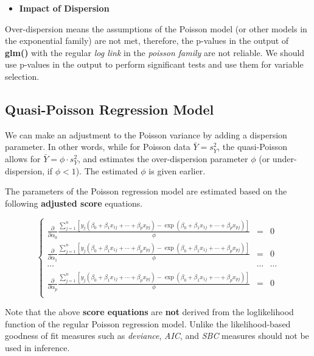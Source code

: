 \documentclass[
]{book}
\providecommand{\tightlist}{%
  \setlength{\itemsep}{0pt}\setlength{\parskip}{0pt}}
\begin{document}
\begin{itemize}
\tightlist
\item
  \textbf{Impact of Dispersion}
\end{itemize}

Over-dispersion means the assumptions of the Poisson model (or other models in the exponential family) are not met, therefore, the p-values in the output of \textbf{glm()} with the regular \emph{log link} in the \emph{poisson family} are not reliable. We should use p-values in the output to perform significant tests and use them for variable selection.

\hfill\break

\hypertarget{quasi-poisson-regression-model}{%
\subsection{Quasi-Poisson Regression Model}\label{quasi-poisson-regression-model}}

We can make an adjustment to the Poisson variance by adding a dispersion parameter. In other words, while for Poisson data \(\bar{Y} = s^2_Y\), the quasi-Poisson allows for \(\bar{Y} = \phi \cdot s^2_Y\), and estimates the over-dispersion parameter \(\phi\) (or under-dispersion, if \(\phi < 1\)). The estimated \(\phi\) is given earlier.

The parameters of the Poisson regression model are estimated based on the following \textbf{adjusted score} equations.

\[
\left\{
\begin{array}{ccccc}
 \frac{\partial}{\partial \alpha_0} \frac{\sum_{j=1}^n \left[y_j(\beta_0 + \beta_1 x_{1j} + \cdots + \beta_p x_{pj})-\exp(\beta_0 + \beta_1 x_{1j} + \cdots + \beta_p x_{pj}) \right]}{\phi} & = & 0 \\
 \frac{\partial}{\partial \alpha_1}\frac{\sum_{j=1}^n \left[y_j(\beta_0 + \beta_1 x_{1j} + \cdots + \beta_p x_{pj})-\exp(\beta_0 + \beta_1 x_{1j} + \cdots + \beta_p x_{pj}) \right] }{\phi}& = & 0 \\
\cdots & \cdots &\cdots \\
 \frac{\partial}{\partial \alpha_p}\frac{\sum_{j=1}^n \left[y_j(\beta_0 + \beta_1 x_{1j} + \cdots + \beta_p x_{pj})-\exp(\beta_0 + \beta_1 x_{1j} + \cdots + \beta_p x_{pj}) \right] }{\phi}& = & 0  \\
\end{array}
\right.
\]

Note that the above \textbf{score equations} are \textbf{not} derived from the loglikelihood function of the regular Poisson regression model. Unlike the likelihood-based goodness of fit measures such as \emph{deviance}, \emph{AIC}, and \emph{SBC} measures should not be used in inference.
\end{document}
